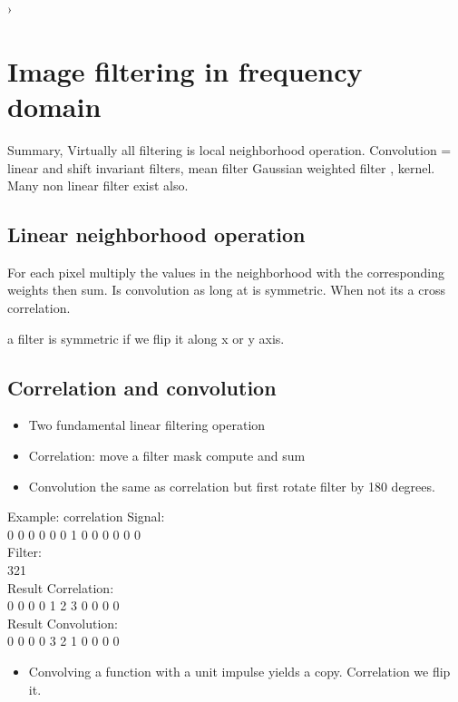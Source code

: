 ›

\section{Image filtering in frequency domain}

Summary, Virtually all filtering is local neighborhood operation.
Convolution = linear and shift invariant filters, mean filter Gaussian weighted filter , kernel. 
Many non linear filter exist also. 

\subsection*{Linear neighborhood operation}
For each pixel multiply the values in the neighborhood with the corresponding weights then sum. Is convolution as long at is symmetric. When not its a cross correlation. 

a filter is symmetric if we flip it along x or y axis. 

\subsection*{Correlation and convolution}
 \begin{itemize}
 	\item Two fundamental linear filtering operation
 	\item Correlation: move a filter mask compute and sum
 	\item  Convolution the same as correlation but first rotate filter by 180 degrees.  
 \end{itemize}
 
 \begin{example}{Example: correlation}
 Signal: \\
 0 0 0 0 0 0 1 0 0 0 0 0 0 \\
 Filter: \\
 321 \\
 Result Correlation: \\
 0 0 0 0 1 2 3 0 0 0 0 \\
 Result Convolution: \\
 0 0 0 0 3 2 1 0 0 0 0 \\
 \begin{itemize}
 	\item Convolving a function with a unit impulse yields a copy. Correlation we flip it. 
 \end{itemize}
 
 \end{example}	



